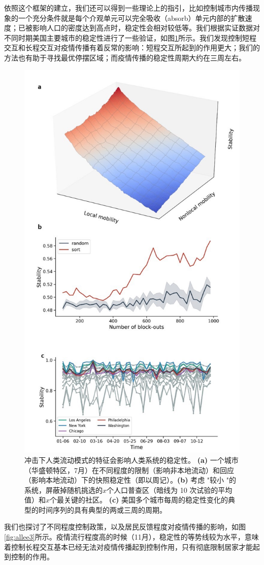 依照这个框架的建立，我们还可以得到一些理论上的指引，比如控制城市内传播现象的一个充分条件就是每个介观单元可以完全吸收（absorb）单元内部的扩散速度；已被影响人口的密度达到高点时，稳定性会相对较低等。我们根据实证数据\cite{kang2020multiscale}对不同时期美国主要城市的稳定性进行了一些验证，如图\ref{fig:allee2}所示。我们发现控制短程交互和长程交互对疫情传播有着反常的影响：短程交互所起到的作用更大；我们的方法也有助于寻找最优停摆区域；而疫情传播的稳定性周期大约在三周左右。
\begin{figure}
    \centering
    \includegraphics[width = 0.7\linewidth]{Figs/Figure2.jpg}
    \caption{冲击下人类流动模式的特征会影响人类系统的稳定性。 \textbf{(a)} 一个城市（华盛顿特区，7月）在不同程度的限制（影响非本地流动）和回应（影响本地流动）下的快照稳定性（即以周记）。\textbf{(b)} 考虑 "较小 "的系统，屏蔽掉随机挑选的$x$个人口普查区（暗线为 10 次试验的平均值）和$x$个最关键的社区。 \textbf{(c)} 美国多个城市每周的稳定性变化的典型的时间序列的具有典型的两或三周的周期。}
    \label{fig:allee2}
\end{figure}

我们也探讨了不同程度控制政策，以及居民反馈程度对疫情传播的影响，如图\ref{fig:allee3}所示。疫情流行程度高的时候（11月），稳定性的等势线较为水平，意味着控制长程交互基本已经无法对疫情传播起到控制作用，只有彻底限制居家才能起到控制的作用。

